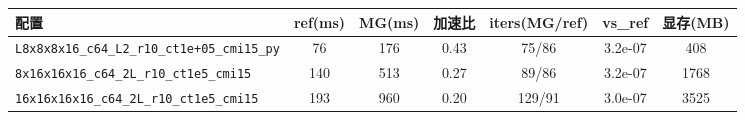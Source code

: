 \begin{tabular}{lcccccc}
\hline
配置 & ref(ms) & MG(ms) & 加速比 & iters(MG/ref) & vs\_ref & 显存(MB) \\
\hline
\texttt{L8x8x8x16\_c64\_L2\_r10\_ct1e+05\_cmi15\_py} & 76 & 176 & 0.43 & 75/86 & 3.2e-07 & 408 \\
\texttt{8x16x16x16\_c64\_2L\_r10\_ct1e5\_cmi15} & 140 & 513 & 0.27 & 89/86 & 3.2e-07 & 1768 \\
\texttt{16x16x16x16\_c64\_2L\_r10\_ct1e5\_cmi15} & 193 & 960 & 0.20 & 129/91 & 3.0e-07 & 3525 \\
\hline
\end{tabular}
